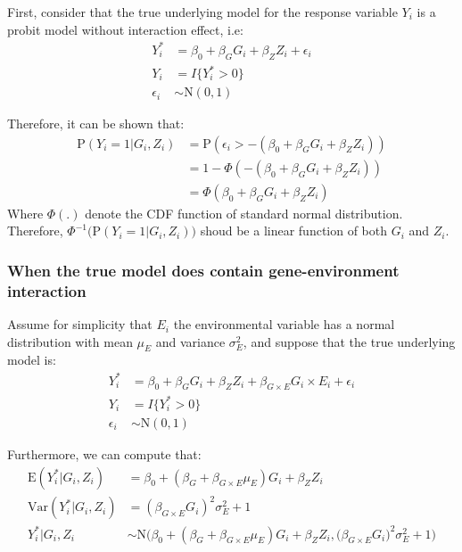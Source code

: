 \documentclass[
]{article}
\begin{document}
First, consider that the true underlying model for the response variable
\(Y_i\) is a probit model without interaction effect, i.e:
\begin{equation}\label{eqn:probitModel}
\begin{aligned}
Y_i^* &= \beta_0 + \beta_G G_i + \beta_Z Z_i + \epsilon_i \\
Y_i &= I\{Y_i^*>0\} \\
\epsilon_i &\sim \text{N}(0,1)
\end{aligned}
\end{equation}

Therefore, it can be shown that:
\begin{equation}\label{eqn:probitModelLinearity}
\begin{aligned}
\text{P}(Y_i = 1| G_i, Z_i) &= \text{P}(\epsilon_i > -(\beta_0 +\beta_G G_i + \beta_Z Z_i)) \\
&= 1 - \Phi(-(\beta_0 + \beta_G G_i + \beta_Z Z_i)) \\
&= \Phi(\beta_0 + \beta_G G_i + \beta_Z Z_i)
\end{aligned}
\end{equation} Where \(\Phi(.)\) denote the CDF function of standard
normal distribution. Therefore,
\(\Phi^{-1}\bigg(\text{P}(Y_i = 1|G_i,Z_i)\bigg)\) shoud be a linear
function of both \(G_i\) and \(Z_i\).

\hypertarget{when-the-true-model-does-contain-gene-environment-interaction}{%
\subsubsection{When the true model does contain gene-environment
interaction}\label{when-the-true-model-does-contain-gene-environment-interaction}}

Assume for simplicity that \(E_i\) the environmental variable has a
normal distribution with mean \(\mu_E\) and variance \(\sigma_E^2\), and
suppose that the true underlying model is:
\begin{equation}\label{eqn:probitModelWithInteraction}
\begin{aligned}
Y_i^* &= \beta_0 + \beta_G G_i + \beta_Z Z_i + \beta_{G\times E} G_i \times E_i + \epsilon_i \\
Y_i &= I\{Y_i^*>0\} \\
\epsilon_i &\sim \text{N}(0,1)
\end{aligned}
\end{equation}

Furthermore, we can compute that:
\begin{equation}\label{eqn:probitModelWithInteraction_MeanVar}
\begin{aligned}
\text{E}(Y_i^*|G_i,Z_i) &= \beta_0 + (\beta_G + \beta_{G\times E} \mu_E)G_i + \beta_Z Z_i \\
\text{Var}(Y_i^*|G_i,Z_i) &= (\beta_{G\times E} G_i)^2 \sigma_E^2 + 1 \\
Y_i^*|G_i, Z_i &\sim \text{N}\bigg(\beta_0 + (\beta_G + \beta_{G\times E} \mu_E)G_i + \beta_Z Z_i,  \big(\beta_{G\times E} G_i\big)^2 \sigma_E^2 + 1\bigg)
\end{aligned}
\end{equation}
\end{document}

